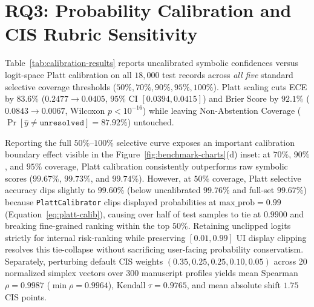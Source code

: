 
\section{RQ3: Probability Calibration and CIS Rubric Sensitivity}

Table~\ref{tab:calibration-results} reports uncalibrated symbolic confidences versus logit-space Platt calibration on all $18{,}000$ test records across \emph{all five} standard selective coverage thresholds ($50\%, 70\%, 90\%, 95\%, 100\%$). Platt scaling cuts ECE by $83.6\%$ ($0.2477 \rightarrow \mathbf{0.0405}$, $95\%$ CI $[0.0394, 0.0415]$) and Brier Score by $92.1\%$ ($0.0843 \rightarrow \mathbf{0.0067}$, Wilcoxon $p < 10^{-16}$) while leaving Non-Abstention Coverage ($\Pr[\hat{y} \neq \texttt{unresolved}] = 87.92\%$) untouched.

Reporting the full $50\%$--$100\%$ selective curve exposes an important calibration boundary effect visible in the Figure~\ref{fig:benchmark-charts}(d) inset: at $70\%$, $90\%$, and $95\%$ coverage, Platt calibration consistently outperforms raw symbolic scores ($99.67\%$, $99.73\%$, and $99.74\%$). However, at $50\%$ coverage, Platt selective accuracy dips slightly to $99.60\%$ (below uncalibrated $99.76\%$ and full-set $99.67\%$) because \texttt{PlattCalibrator} clips displayed probabilities at $\text{max\_prob} = 0.99$ (Equation~\eqref{eq:platt-calib}), causing over half of test samples to tie at $0.9900$ and breaking fine-grained ranking within the top $50\%$. Retaining unclipped logits strictly for internal risk-ranking while preserving $[0.01, 0.99]$ UI display clipping resolves this tie-collapse without sacrificing user-facing probability conservatism. Separately, perturbing default CIS weights $(0.35, 0.25, 0.25, 0.10, 0.05)$ across 20 normalized simplex vectors over 300 manuscript profiles yields mean Spearman $\rho = 0.9987$ ($\min \rho = 0.9964$), Kendall $\tau = 0.9765$, and mean absolute shift $1.75$ CIS points.


